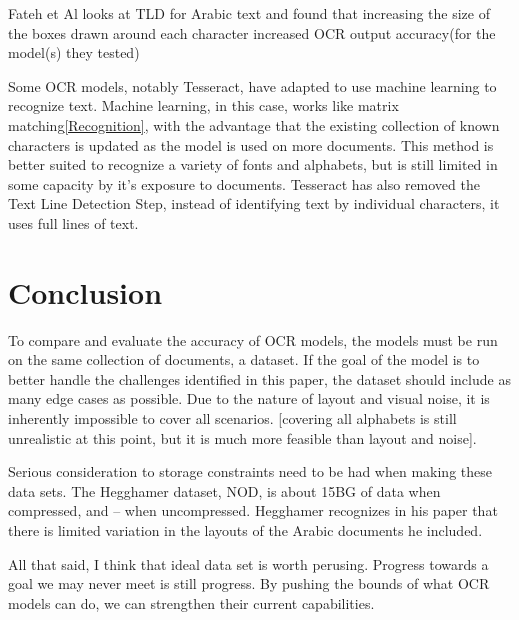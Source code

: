 \documentclass[sigplan,screen,nonacm]{acmart-tagged}
\begin{document}
Fateh et Al\citep{Fateh:2024} looks at TLD for Arabic text and found that increasing the size of the boxes drawn around each character increased OCR output accuracy(for the model(s) they tested)

Some OCR models, notably Tesseract, have adapted to use machine learning to recognize text. Machine learning, in this case, works like matrix matching\ref{Recognition}, with the advantage that the existing collection of known characters is updated as the model is used on more documents. This method is better suited to recognize a variety of fonts and alphabets, but is still limited in some capacity by it's exposure to documents. Tesseract has also removed the Text Line Detection Step, instead of identifying text by individual characters, it uses full lines of text. 

\section{Conclusion}
\label{Conclusion}
To compare and evaluate the accuracy of OCR models, the models must be run on the same collection of documents, a dataset. If the goal of the model is to better handle the challenges identified in this paper, the dataset should include as many edge cases as possible. Due to the nature of layout and visual noise, it is inherently impossible to cover all scenarios. [covering all alphabets is still unrealistic at this point, but it is much more feasible than layout and noise]. 

Serious consideration to storage constraints need to be had when making these data sets. The Hegghamer dataset, NOD, is about 15BG of data when compressed, and -- when uncompressed. Hegghamer recognizes in his paper that there is limited variation in the layouts of the Arabic documents he included.

All that said, I think that ideal data set is worth perusing. Progress towards a goal we may never meet is still progress. By pushing the bounds of what OCR models can do, we can strengthen their current capabilities.

%
%
\end{document}
